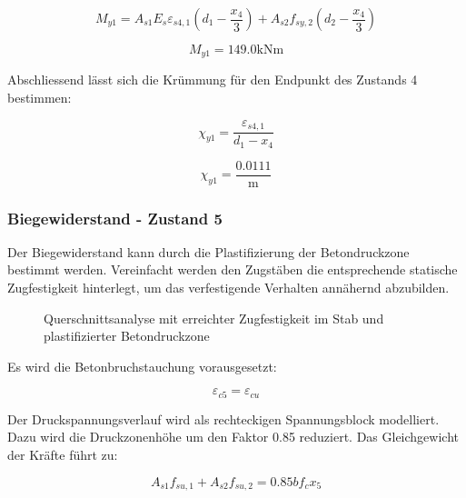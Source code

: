 \documentclass[
  12pt,
  letterpaper,
  egregdoesnotlikesansseriftitles]{scrreprt}
\begin{document}
\begin{equation}M_{y 1} = A_{s 1} E_{s} \varepsilon_{s4,1} \left(d_{1} - \frac{x_{4}}{3}\right) + A_{s 2} f_{sy,2} \left(d_{2} - \frac{x_{4}}{3}\right)\end{equation}

\begin{equation}M_{y 1} = 149.0 \text{kN} \text{m}\end{equation}

Abschliessend lässt sich die Krümmung für den Endpunkt des Zustands 4
bestimmen:

\begin{equation}\chi_{y1} = \frac{\varepsilon_{s4,1}}{d_{1} - x_{4}}\end{equation}

\begin{equation}\chi_{y1} = \frac{0.0111}{\text{m}}\end{equation}

\subsubsection{Biegewiderstand - Zustand
5}\label{biegewiderstand---zustand-5}

Der Biegewiderstand kann durch die Plastifizierung der Betondruckzone
bestimmt werden. Vereinfacht werden den Zugstäben die entsprechende
statische Zugfestigkeit hinterlegt, um das verfestigende Verhalten
annähernd abzubilden.

\begin{figure}[H]


\caption{\label{fig-qs6_sv14}Querschnittsanalyse mit erreichter
Zugfestigkeit im Stab und plastifizierter Betondruckzone}

\end{figure}%

Es wird die Betonbruchstauchung vorausgesetzt:

\begin{equation}\varepsilon_{c5} = \varepsilon_{cu}\end{equation}

Der Druckspannungsverlauf wird als rechteckigen Spannungsblock
modelliert. Dazu wird die Druckzonenhöhe um den Faktor 0.85 reduziert.
Das Gleichgewicht der Kräfte führt zu:

\begin{equation}A_{s 1} f_{su,1} + A_{s 2} f_{su,2} = 0.85 b f_{c} x_{5}\end{equation}
\end{document}

